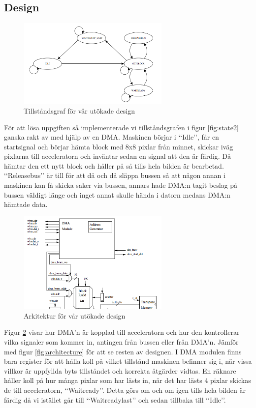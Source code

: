 \documentclass[a4paper]{article}
\begin{document}
\subsection{Design}
\begin{figure}[h]
\centering
\includegraphics[width=280px]{fsmlab3.png}
\caption{Tillståndsgraf för vår utökade design}
\label{fig:state}
\end{figure}

För att lösa uppgiften så implementerade vi tillståndsgrafen i figur
\ref{fig:state2} ganska rakt av med hjälp av en DMA. Maskinen börjar i
\lq\lq{}Idle\rq\rq{}, får en startsignal och börjar hämta block med 8x8
pixlar från minnet, skickar iväg pixlarna till acceleratorn och inväntar
sedan en signal att den är färdig. Då hämtar den ett nytt block och
håller på så tills hela bilden är bearbetad. \lq\lq{}Releasebus\rq\rq{}
är till för att då och då släppa bussen så att någon annan i maskinen
kan få skicka saker via bussen, annars hade DMA:n tagit beslag på
bussen väldigt länge och inget annat skulle hända i datorn medans
DMA:n hämtade data.\\

\begin{figure}[h]
\centering
\includegraphics[width=280px]{architecturelab3.png}
\caption{Arkitektur för vår utökade design}
\label{fig:arch3}
\end{figure}

Figur \ref{fig:arch3} visar hur DMA\rq{}n är kopplad till acceleratorn
och hur den kontrollerar vilka signaler som kommer in, antingen från
bussen eller från DMA\rq{}n. Jämför med figur \ref{fig:architecture} för
att se resten av designen. I DMA modulen finns bara register för att
hålla koll på vilket tillstånd maskinen befinner sig i, när vissa
villkor är uppfyllda byts tillståndet och korrekta åtgärder vidtas. En
räknare håller koll på hur många pixlar som har lästs in, när det har
lästs 4 pixlar skickas de till acceleratorn, \lq\lq{}Waitready\rq\rq{}.
Detta görs om och om igen tills hela bilden är färdig då vi istället går
till \lq\lq{}Waitreadylast\rq\rq{} och sedan tillbaka till
\lq\lq{}Idle\rq\rq{}.\\
\end{document}
